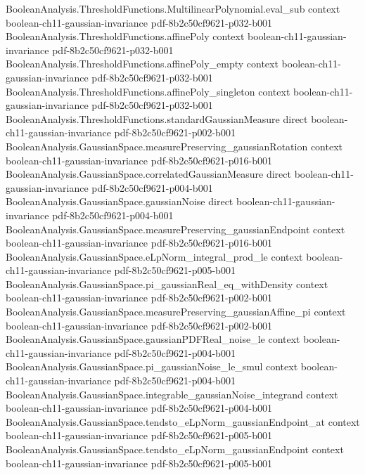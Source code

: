 \begin{theorem}
\proofstep
  {BooleanAnalysis.ThresholdFunctions.MultilinearPolynomial.eval_sub}
  {context}
  {boolean-ch11-gaussian-invariance}
  {pdf-8b2c50cf9621-p032-b001}
\proofstep
  {BooleanAnalysis.ThresholdFunctions.affinePoly}
  {context}
  {boolean-ch11-gaussian-invariance}
  {pdf-8b2c50cf9621-p032-b001}
\proofstep
  {BooleanAnalysis.ThresholdFunctions.affinePoly_empty}
  {context}
  {boolean-ch11-gaussian-invariance}
  {pdf-8b2c50cf9621-p032-b001}
\proofstep
  {BooleanAnalysis.ThresholdFunctions.affinePoly_singleton}
  {context}
  {boolean-ch11-gaussian-invariance}
  {pdf-8b2c50cf9621-p032-b001}
\proofstep
  {BooleanAnalysis.ThresholdFunctions.standardGaussianMeasure}
  {direct}
  {boolean-ch11-gaussian-invariance}
  {pdf-8b2c50cf9621-p002-b001}
\proofstep
  {BooleanAnalysis.GaussianSpace.measurePreserving_gaussianRotation}
  {context}
  {boolean-ch11-gaussian-invariance}
  {pdf-8b2c50cf9621-p016-b001}
\proofstep
  {BooleanAnalysis.GaussianSpace.correlatedGaussianMeasure}
  {direct}
  {boolean-ch11-gaussian-invariance}
  {pdf-8b2c50cf9621-p004-b001}
\proofstep
  {BooleanAnalysis.GaussianSpace.gaussianNoise}
  {direct}
  {boolean-ch11-gaussian-invariance}
  {pdf-8b2c50cf9621-p004-b001}
\proofstep
  {BooleanAnalysis.GaussianSpace.measurePreserving_gaussianEndpoint}
  {context}
  {boolean-ch11-gaussian-invariance}
  {pdf-8b2c50cf9621-p016-b001}
\proofstep
  {BooleanAnalysis.GaussianSpace.eLpNorm_integral_prod_le}
  {context}
  {boolean-ch11-gaussian-invariance}
  {pdf-8b2c50cf9621-p005-b001}
\proofstep
  {BooleanAnalysis.GaussianSpace.pi_gaussianReal_eq_withDensity}
  {context}
  {boolean-ch11-gaussian-invariance}
  {pdf-8b2c50cf9621-p002-b001}
\proofstep
  {BooleanAnalysis.GaussianSpace.measurePreserving_gaussianAffine_pi}
  {context}
  {boolean-ch11-gaussian-invariance}
  {pdf-8b2c50cf9621-p002-b001}
\proofstep
  {BooleanAnalysis.GaussianSpace.gaussianPDFReal_noise_le}
  {context}
  {boolean-ch11-gaussian-invariance}
  {pdf-8b2c50cf9621-p004-b001}
\proofstep
  {BooleanAnalysis.GaussianSpace.pi_gaussianNoise_le_smul}
  {context}
  {boolean-ch11-gaussian-invariance}
  {pdf-8b2c50cf9621-p004-b001}
\proofstep
  {BooleanAnalysis.GaussianSpace.integrable_gaussianNoise_integrand}
  {context}
  {boolean-ch11-gaussian-invariance}
  {pdf-8b2c50cf9621-p004-b001}
\proofstep
  {BooleanAnalysis.GaussianSpace.tendsto_eLpNorm_gaussianEndpoint_at}
  {context}
  {boolean-ch11-gaussian-invariance}
  {pdf-8b2c50cf9621-p005-b001}
\proofstep
  {BooleanAnalysis.GaussianSpace.tendsto_eLpNorm_gaussianEndpoint}
  {context}
  {boolean-ch11-gaussian-invariance}
  {pdf-8b2c50cf9621-p005-b001}

\end{theorem}
